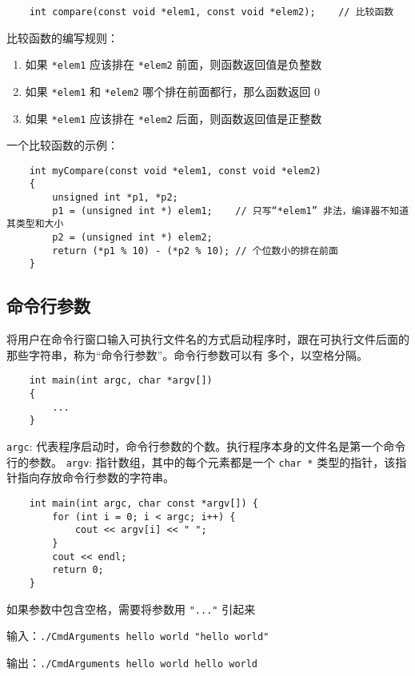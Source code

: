 \documentclass[UTF8]{ctexart}
\begin{document}
\begin{verbatim}
    int compare(const void *elem1, const void *elem2);    // 比较函数
\end{verbatim}

比较函数的编写规则：
\begin{enumerate}
    \item 如果 \texttt{*elem1} 应该排在 \texttt{*elem2} 前面，则函数返回值是负整数
    \item 如果 \texttt{*elem1} 和 \texttt{*elem2} 哪个排在前面都行，那么函数返回 0
    \item 如果 \texttt{*elem1} 应该排在 \texttt{*elem2} 后面，则函数返回值是正整数
\end{enumerate}

一个比较函数的示例：
\begin{verbatim}
    int myCompare(const void *elem1, const void *elem2)
    {
        unsigned int *p1, *p2;
        p1 = (unsigned int *) elem1;    // 只写“*elem1” 非法，编译器不知道其类型和大小
        p2 = (unsigned int *) elem2;
        return (*p1 % 10) - (*p2 % 10); // 个位数小的排在前面
    }
\end{verbatim}

\subsection{命令行参数}
将用户在命令行窗口输入可执行文件名的方式启动程序时，跟在可执行文件后面的那些字符串，称为“命令行参数”。命令行参数可以有
多个，以空格分隔。

\begin{verbatim}
    int main(int argc, char *argv[])
    {
        ...
    }
\end{verbatim}

\texttt{argc}: 代表程序启动时，命令行参数的个数。执行程序本身的文件名是第一个命令行的参数。
\texttt{argv}: 指针数组，其中的每个元素都是一个 \texttt{char *} 类型的指针，该指针指向存放命令行参数的字符串。

\begin{verbatim}
    int main(int argc, char const *argv[]) {
        for (int i = 0; i < argc; i++) {
            cout << argv[i] << " ";
        }
        cout << endl;
        return 0;
    }
\end{verbatim}

如果参数中包含空格，需要将参数用 \texttt{"..."} 引起来

输入：\texttt{./CmdArguments hello world "hello world"}

输出：\texttt{./CmdArguments hello world hello world}
\end{document}
